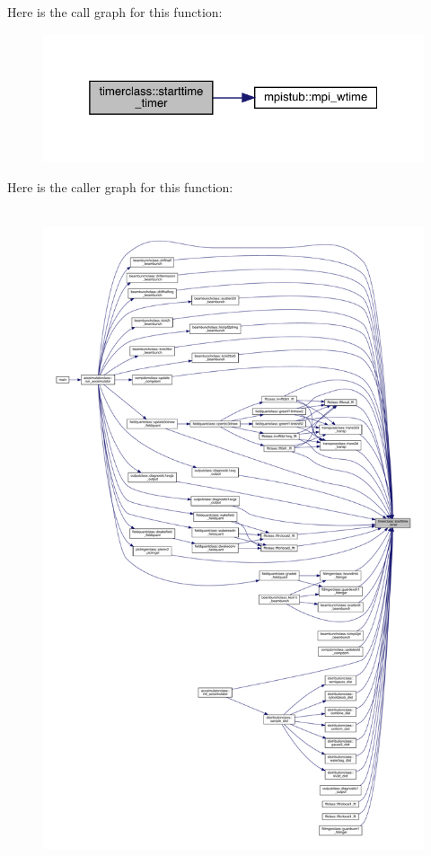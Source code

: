 Here is the call graph for this function\+:\nopagebreak
\begin{figure}[H]
\begin{center}
\leavevmode
\includegraphics[width=325pt]{namespacetimerclass_afb272bcdcff72d225c2df5862630025c_cgraph}
\end{center}
\end{figure}
Here is the caller graph for this function\+:
\nopagebreak
\begin{figure}[H]
\begin{center}
\leavevmode
\includegraphics[height=550pt]{namespacetimerclass_afb272bcdcff72d225c2df5862630025c_icgraph}
\end{center}
\end{figure}


